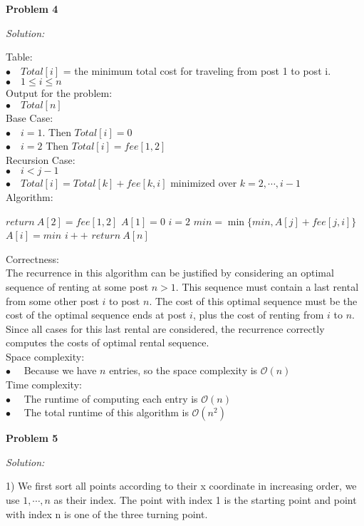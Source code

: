 \documentclass[12pt,letterpaper]{article}
\def\pp{\par\noindent}
\newcommand{\problem}[1]{ \bigskip \pp \textbf{Problem #1}\par}
\newcommand{\solution}{\textit{Solution:}\par}
\begin{document}
\problem{4}
\solution
Table: \\
$\bullet \quad Total[i]$ = the minimum total cost for traveling from post 1 to post i. \\
$\bullet \quad 1 \le i \le n$ \\
Output for the problem: \\
$\bullet \quad Total[n]$ \\
Base Case: \\
$\bullet \quad i = 1 $. Then $Total[i] = 0 $  \\
$\bullet \quad i = 2 $ Then $Total[i] = fee[1,2]$ \\
Recursion Case: \\
$\bullet \quad i < j - 1$ \\
$\bullet \quad Total[i] = Total[k] + fee[k,i]$ minimized over $ k = 2,\cdots,i-1$ \\
Algorithm: \\
\begin{algorithm}[H]
 {
	$return\  A[2] = fee[1,2]$ \;
}
$A[1] = 0$\;
$ i = 2 $\;
{
  {
 $min = \min \{min,A[j] + fee[j,i] \}$\;
 }
$A[i] = min $\;
$ i ++ $\;
}
   $return\  A[n]$ \;
\end{algorithm}
Correctness: \\
The recurrence in this algorithm can be justified by considering an optimal sequence of renting at some post $ n > 1$. This sequence must contain a last rental from some other post $i$ to post $n$. The cost of this optimal sequence must be the cost of the optimal sequence ends at post $i$, plus the cost of renting from $i$ to $n$. Since all cases for this last rental are considered, the recurrence correctly computes the costs of optimal rental sequence. \\
Space complexity: \\
$\bullet \quad$ Because we have $ n $ entries, so the space complexity is $\mathcal{O}(n)$ \\
Time complexity: \\
$\bullet \quad$ The runtime of computing each entry is $\mathcal{O}(n)$ \\
$\bullet \quad$ The total runtime of this algorithm is $\mathcal{O}(n^2)$ \\

\problem{5}
\solution
1) We first sort all points according to their x coordinate in increasing order, we use $1,\cdots,n$ as their index. The point with index 1 is the starting point and point with index n is one of the three turning point. \\
\end{document}

